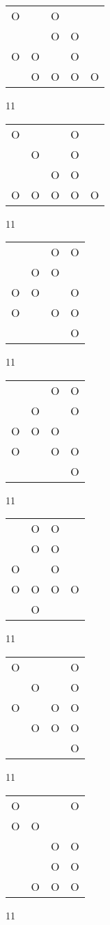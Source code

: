 \begin{tabular}{|m{0.2cm}m{0.2cm}m{0.2cm}m{0.2cm}m{0.2cm}|}\hline
O& &O& & \\
 & &O&O& \\
O&O& &O& \\
 &O&O&O&O\\
\hline\end{tabular}11
\begin{tabular}{|m{0.2cm}m{0.2cm}m{0.2cm}m{0.2cm}m{0.2cm}|}\hline
O& & &O& \\
 &O& &O& \\
 & &O&O& \\
O&O&O&O&O\\
\hline\end{tabular}11
\begin{tabular}{|m{0.2cm}m{0.2cm}m{0.2cm}m{0.2cm}|}\hline
 & &O&O\\
 &O&O& \\
O&O& &O\\
O& &O&O\\
 & & &O\\
\hline\end{tabular}11
\begin{tabular}{|m{0.2cm}m{0.2cm}m{0.2cm}m{0.2cm}|}\hline
 & &O&O\\
 &O& &O\\
O&O&O& \\
O& &O&O\\
 & & &O\\
\hline\end{tabular}11
\begin{tabular}{|m{0.2cm}m{0.2cm}m{0.2cm}m{0.2cm}|}\hline
 &O&O& \\
 &O&O& \\
O& &O& \\
O&O&O&O\\
 &O& & \\
\hline\end{tabular}11
\begin{tabular}{|m{0.2cm}m{0.2cm}m{0.2cm}m{0.2cm}|}\hline
O& & &O\\
 &O& &O\\
O& &O&O\\
 &O&O&O\\
 & & &O\\
\hline\end{tabular}11
\begin{tabular}{|m{0.2cm}m{0.2cm}m{0.2cm}m{0.2cm}|}\hline
O& & &O\\
O&O& & \\
 & &O&O\\
 & &O&O\\
 &O&O&O\\
\hline\end{tabular}11
